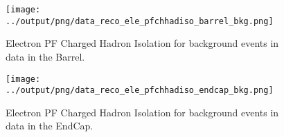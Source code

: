 \documentclass[11pt]{book}
\begin{document}
\begin{figure}[htb]
\centering
\texttt{[image: ../output/png/data\_reco\_ele\_pfchhadiso\_barrel\_bkg.png]}
\caption{Electron PF Charged Hadron Isolation for background events in data in the Barrel.}
\label{fig:data_ele_pfchhadiso_barrel_bkg}
\end{figure}

\begin{figure}[htb]
\centering
\texttt{[image: ../output/png/data\_reco\_ele\_pfchhadiso\_endcap\_bkg.png]}
\caption{Electron PF Charged Hadron Isolation for background events in data in the EndCap.}
\label{fig:data_ele_pfchhadiso_endcap_bkg}
\end{figure}
\end{document}
